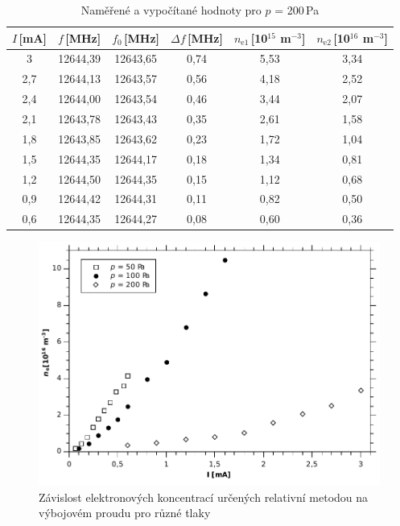 \documentclass[12pt]{article}
\begin{document}
\begin{table}[htbp]
\begin{center}
\begin{tabular}{|c|c|c|c|c|c|}
\hline
$I$\,[mA] & $f$\,[MHz] & $f_0$\,[MHz] & $\Delta f$\,[MHz] & $n_\mathrm{e1}$\,[10$^{15}$ m$^{-3}$] & $n_\mathrm{e2}$\,[10$^{16}$ m$^{-3}$] \\ \hline \hline
3   & 12644,39 & 12643,65 & 0,74 & 5,53 & 3,34 \\ \hline
2,7 & 12644,13 & 12643,57 & 0,56 & 4,18 & 2,52 \\ \hline
2,4 & 12644,00 & 12643,54 & 0,46 & 3,44 & 2,07 \\ \hline
2,1 & 12643,78 & 12643,43 & 0,35 & 2,61 & 1,58 \\ \hline
1,8 & 12643,85 & 12643,62 & 0,23 & 1,72 & 1,04 \\ \hline
1,5 & 12644,35 & 12644,17 & 0,18 & 1,34 & 0,81 \\ \hline
1,2 & 12644,50 & 12644,35 & 0,15 & 1,12 & 0,68 \\ \hline
0,9 & 12644,42 & 12644,31 & 0,11 & 0,82 & 0,50 \\ \hline
0,6 & 12644,35 & 12644,27 & 0,08 & 0,60 & 0,36 \\ \hline
\end{tabular}
\caption{Naměřené a vypočítané hodnoty pro $p$ = 200\,Pa}
\label{p200}
\end{center}
\end{table}

\begin{figure}[t!]
\begin{center}
\includegraphics[width=14cm]{Graph1.pdf}
\caption{Závislost elektronových koncentrací určených relativní metodou na výbojovém proudu pro různé tlaky}
\label{graph1}
\end{center}
\end{figure}
\end{document}
